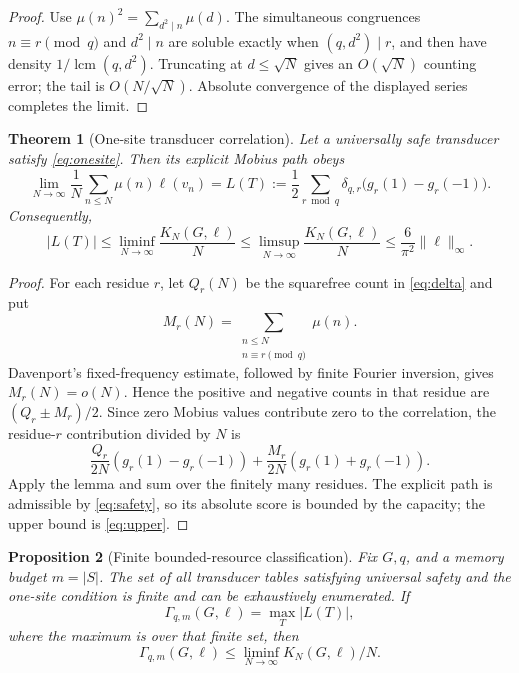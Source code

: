 \documentclass[11pt]{article}
\newtheorem{theorem}{Theorem}[section]
\newtheorem{proposition}[theorem]{Proposition}
\theoremstyle{definition}
\theoremstyle{remark}
\newcommand{\Mob}{\mu}
\newcommand{\ellobs}{\ell}
\newcommand{\abs}[1]{\lvert#1\rvert}
\begin{document}
\begin{proof}
Use \(\Mob(n)^2=\sum_{d^2\mid n}\Mob(d)\).  The simultaneous congruences
\(n\equiv r\pmod q\) and \(d^2\mid n\) are soluble exactly when
\((q,d^2)\mid r\), and then have density
\(1/\operatorname{lcm}(q,d^2)\).  Truncating at \(d\leq\sqrt N\) gives an
\(O(\sqrt N)\) counting error; the tail is \(O(N/\sqrt N)\).  Absolute
convergence of the displayed series completes the limit.
\end{proof}

\begin{theorem}[One-site transducer correlation]
Let a universally safe transducer satisfy \eqref{eq:onesite}.  Then its
explicit Mobius path obeys
\begin{equation}
 \lim_{N\to\infty}\frac1N\sum_{n\leq N}\Mob(n)\ellobs(v_n)
 =L(T):=\frac12\sum_{r\bmod q}\delta_{q,r}
       \bigl(g_r(1)-g_r(-1)\bigr).
\label{eq:limit}
\end{equation}
Consequently,
\begin{equation}
 |L(T)|\leq\liminf_{N\to\infty}\frac{K_N(G,\ellobs)}N
 \leq\limsup_{N\to\infty}\frac{K_N(G,\ellobs)}N
 \leq\frac6{\pi^2}\|\ellobs\|_\infty.
\label{eq:bracket}
\end{equation}
\end{theorem}

\begin{proof}
For each residue \(r\), let \(Q_r(N)\) be the squarefree count in
\eqref{eq:delta} and put
\[
 M_r(N)=\sum_{\substack{n\leq N\\n\equiv r\pmod q}}\Mob(n).
\]
Davenport's
fixed-frequency estimate, followed by finite Fourier inversion, gives
\(M_r(N)=o(N)\).  Hence the positive and negative counts in that residue are
\((Q_r\pm M_r)/2\).  Since zero Mobius values contribute zero to the
correlation, the residue-\(r\) contribution divided by \(N\) is
\[
 \frac{Q_r}{2N}(g_r(1)-g_r(-1))
 +\frac{M_r}{2N}(g_r(1)+g_r(-1)).
\]
Apply the lemma and sum over the finitely many residues.  The explicit path
is admissible by \eqref{eq:safety}, so its absolute score is bounded by the
capacity; the upper bound is \eqref{eq:upper}.
\end{proof}

\begin{proposition}[Finite bounded-resource classification]
Fix \(G,q\), and a memory budget \(m=\abs S\).  The set of all transducer
tables satisfying universal safety and the one-site condition is finite and
can be exhaustively enumerated.  If
\[
 \Gamma_{q,m}(G,\ellobs)=\max_T\abs{L(T)},
\]
where the maximum is over that finite set, then
\[
 \Gamma_{q,m}(G,\ellobs)\leq\liminf_{N\to\infty}K_N(G,\ellobs)/N.
\]
\end{proposition}
\end{document}
